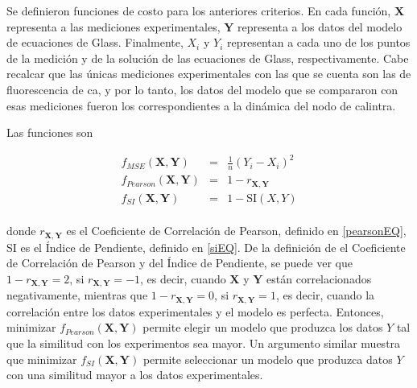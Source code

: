 Se definieron funciones de costo para los anteriores criterios. En cada función, $\mathbf{X}$ representa a las mediciones experimentales, $\mathbf{Y}$ representa a los datos del modelo de ecuaciones de Glass. Finalmente, $X_i$ y $Y_i$ representan a cada uno de los puntos de la medición y de la solución de las ecuaciones de Glass, respectivamente. Cabe recalcar que las únicas mediciones experimentales con las que se cuenta son las de fluorescencia de \ac{ca}, y por lo tanto, los datos del modelo que se compararon con esas mediciones fueron los correspondientes a la dinámica del nodo de \ac{calintra}.

Las funciones son

\begin{eqnarray}
f_{MSE}(\mathbf{X},\mathbf{Y}) & = & \frac{1}{n} (Y_i - X_i)^2\\
f_{Pearson}(\mathbf{X},\mathbf{Y}) & = & 1 - r_{\mathbf{X},\mathbf{Y}}\\
f_{SI}(\mathbf{X},\mathbf{Y}) & = & 1 - \mathrm{SI}(X,Y)
\end{eqnarray}
\\
donde $r_{\mathbf{X},\mathbf{Y}}$ es el Coeficiente de Correlación de Pearson, definido en \ref{pearsonEQ}, SI es el Índice de Pendiente, definido en \ref{siEQ}. De la definición de el Coeficiente de Correlación de Pearson y del Índice de Pendiente, se puede ver que $1 - r_{\mathbf{X},\mathbf{Y}} = 2$, si $r_{\mathbf{X},\mathbf{Y}} = -1$, es decir, cuando $\mathbf{X}$ y $\mathbf{Y}$ están correlacionados negativamente, mientras que $1 - r_{\mathbf{X},\mathbf{Y}} = 0$, si $r_{\mathbf{X},\mathbf{Y}} = 1$, es decir, cuando la correlación entre los datos experimentales y el modelo es perfecta. Entonces, minimizar $f_{Pearson}(\mathbf{X},\mathbf{Y})$ permite elegir un modelo que produzca los datos $Y$ tal que la similitud con los experimentos sea mayor. Un argumento similar muestra que minimizar $f_{SI}(\mathbf{X},\mathbf{Y})$ permite seleccionar un modelo que produzca datos $Y$ con una similitud mayor a los datos experimentales.

